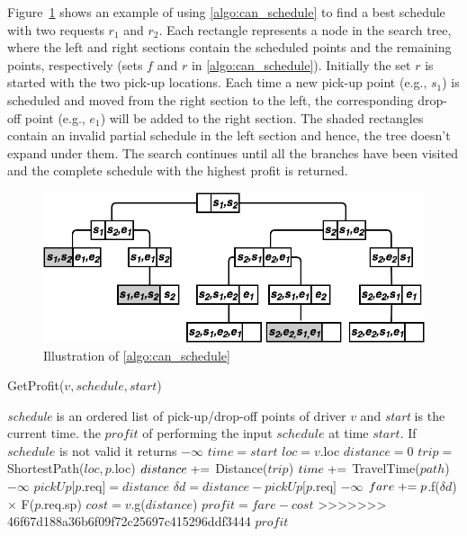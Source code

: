 \begin{algorithm}
\begin{algorithmic}[1]
Figure~\ref{fig:bAndb} shows an example of using \cref{algo:can_schedule} to find a best schedule with two requests $r_1$ and $r_2$. Each rectangle represents a node in the search tree, where the left and right sections contain the scheduled points and the remaining points, respectively (sets $f$ and $r$ in \cref{algo:can_schedule}). Initially the set $r$ is started with the two pick-up locations. Each time a new pick-up point (e.g., $s_1$) is scheduled and moved from the right section to the left, the corresponding drop-off point (e.g., $e_1$) will be added to the right section. The shaded rectangles contain an invalid partial schedule in the left section and hence, the tree doesn't expand under them. The search continues until all the branches have been visited and the complete schedule with the highest profit is returned.

\begin{figure}[!ht]
	\centering
	\includegraphics[width=0.75\columnwidth]{fig/bAndb.png}
	\vspace{-0mm}\caption{Illustration of \cref{algo:can_schedule}} \vspace{-2mm} \label{fig:bAndb}
\end{figure}\vspace{-0mm}

\begin{algorithm}
	\caption{GetProfit($v, schedule, start$)}
	\label{algo:get_profit}
	\begin{algorithmic}[1]
		\REQUIRE \emph{schedule} is an ordered list of pick-up/drop-off points of driver $v$ and \emph{start} is the current time.
		\ENSURE the $profit$ of performing the input $schedule$ at time $start$. If $schedule$ is not valid it returns $-\infty$
		\STATE $time = start$
		\STATE $loc = v.$loc\label{ln:loc}
		\STATE $distance = 0$
		\STATE $trip =$ ShortestPath($loc, p$.loc)
		\STATE $distance \mathrel{+}=$ Distance($trip$)
		\STATE $time \mathrel{+}=$ TravelTime($path$)
		\label{ln:mwt}
		\RETURN $-\infty$
		\ENDIF
		\STATE $pickUp[p$.req$]=distance$
		\ENDIF
		\STATE $\delta d = distance - pickUp[p$.req$]$
		\label{ln:mad}
		\RETURN $-\infty$
		\ENDIF
		\STATE $fare \mathrel{+}= p$.f($\delta d$) $\times$ F($p$.req.sp)\label{ln:delta}
		\STATE $cost = v$.g($distance$)\label{ln:dprof}
		\ENDIF
		\ENDFOR
		\STATE $profit = fare - cost$
>>>>>>> 46f67d188a36b6f09f72c25697c415296ddf3444
		\RETURN $profit$
	\end{algorithmic} 
\end{algorithm}


\end{algorithmic}
\end{algorithm}
